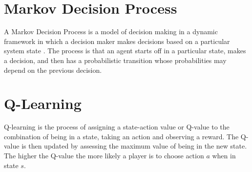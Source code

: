 \documentclass[a0,landscape]{a0poster}
\begin{document}
\begin{multicols}{3}
\section*{Markov Decision Process}
A Markov Decision Process is a model of decision making in a dynamic framework in which a decision maker makes decisions based on a particular system state \cite{puterman2009markov}.
The process is that an agent starts off in a particular state, makes a decision, and then has a probabilistic transition whose probabilities may depend on the previous decision.

\section*{Q-Learning}
Q-learning is the process of assigning a state-action value or Q-value to the combination of being in a state, taking an action and observing a reward.
The Q-value is then updated by assessing the maximum value of being in the new state.
The higher the Q-value the more likely a player is to choose action $a$ when in state $s$.



\end{multicols}
\end{document}

